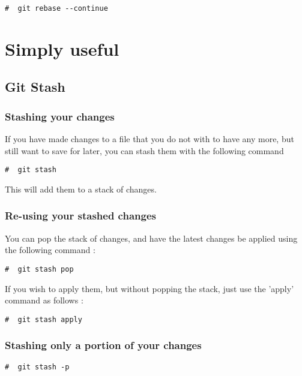 \documentclass{article}
\begin{document}
\begin{lstlisting}[style=BashInputStyle]
    #  git rebase --continue
\end{lstlisting}



\section{Simply useful}

\subsection{Git Stash}

\subsubsection{Stashing your changes}

If you have made changes to a file that you do not with to have any more, but still want to save for later, you can stash them with the following command

\begin{lstlisting}[style=BashInputStyle]
    #  git stash
\end{lstlisting}

This will add them to a stack of changes.

\subsubsection{Re-using your stashed changes}

You can pop the stack of changes, and have the latest changes be applied using the following command :

\begin{lstlisting}[style=BashInputStyle]
    #  git stash pop
\end{lstlisting}

If you wish to apply them, but without popping the stack, just use the 'apply' command as follows :

\begin{lstlisting}[style=BashInputStyle]
    #  git stash apply
\end{lstlisting}

\subsubsection{Stashing only a portion of your changes}

\begin{lstlisting}[style=BashInputStyle]
    #  git stash -p
\end{lstlisting}


\end{document}
